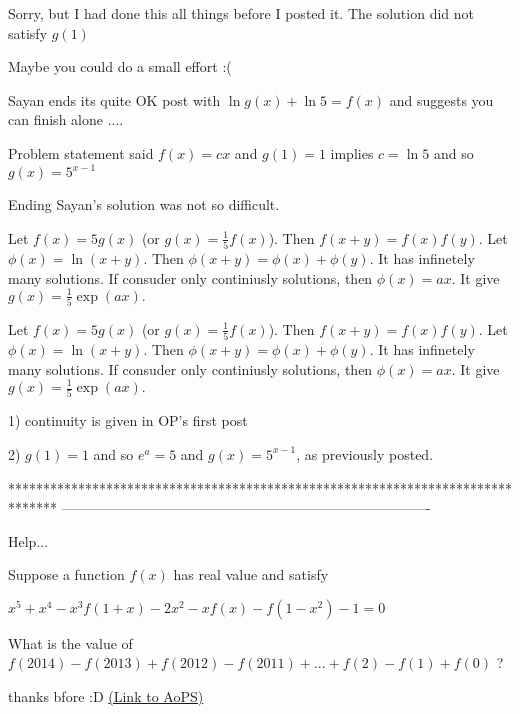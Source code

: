 \begin{solution}
	\begin{tcolorbox}Sorry, but I had done this all things before I posted it. The solution did not satisfy $g(1)$\end{tcolorbox}
Maybe you could do a small effort :(

Sayan ends its quite OK post with $\ln g(x)+\ln 5 =f(x)$ and suggests you can finish alone ....

Problem statement said $f(x)=cx$ and $g(1)=1$ implies $c=\ln 5$ and so $\boxed{g(x)=5^{x-1}}$

Ending Sayan's solution was not so difficult.
\end{solution}



\begin{solution}
	Let $f(x)=5g(x)$ (or $g(x)=\frac 15 f(x)$). Then
$f(x+y)=f(x)f(y)$. Let $\phi(x)=\ln(x+y)$. Then
$\phi(x+y)=\phi(x)+\phi(y)$. It has infinetely many solutions.
If consuder only continiusly solutions, then
$\phi(x)=ax$. It give $g(x)=\frac 15 \exp(ax).$
\end{solution}



\begin{solution}
	\begin{tcolorbox}Let $f(x)=5g(x)$ (or $g(x)=\frac 15 f(x)$). Then
$f(x+y)=f(x)f(y)$. Let $\phi(x)=\ln(x+y)$. Then
$\phi(x+y)=\phi(x)+\phi(y)$. It has infinetely many solutions.
If consuder only continiusly solutions, then
$\phi(x)=ax$. It give $g(x)=\frac 15 \exp(ax).$\end{tcolorbox}

1) continuity is given in OP's first post

2) $g(1)=1$ and so $e^a=5$  and $g(x)=5^{x-1}$, as previously posted.
\end{solution}
*******************************************************************************
-------------------------------------------------------------------------------

\begin{problem}
	Help...

Suppose a function $ f(x) $ has real value and satisfy

$ x^5+x^4-x^3f(1+x)-2x^2-xf(x)-f(1-x^2)-1=0 $

What is the value of $ f(2014) - f(2013)+f(2012)-f(2011)+...+f(2)-f(1)+f(0) $ ?

thanks bfore :D
	\flushright \href{https://artofproblemsolving.com/community/c6h574425}{(Link to AoPS)}
\end{problem}



